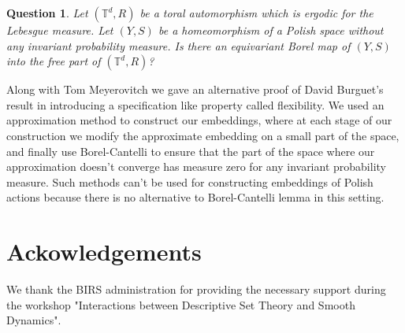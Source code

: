 \documentclass{article}
\newtheorem{question}[theorem]{Question}
\theoremstyle{definition}
\begin{document}
 \begin{question}\label{question: Not_Main}\cite{chandgotia2022borel}
 	Let $(\mathbb T^d, R)$ be a toral automorphism which is ergodic for the Lebesgue measure. Let $(Y, S)$ be a homeomorphism of a Polish space without any invariant probability measure. Is there an equivariant Borel map of $(Y, S)$ into the free part of $(\mathbb T^d, R)$?
 \end{question}
 
Along with Tom Meyerovitch we gave an alternative proof of David Burguet's result in \cite{https://doi.org/10.1112/plms.12398} introducing a specification like property called flexibility. We used an approximation method to construct our embeddings, where at each stage of our construction we modify the approximate embedding on a small part of the space, and finally use Borel-Cantelli to ensure that the part of the space where our approximation doesn't converge has measure zero for any invariant probability measure. Such methods can't be used for constructing embeddings of Polish actions because there is no alternative to Borel-Cantelli lemma in this setting. 

\section{Ackowledgements}

We thank the BIRS administration for providing the necessary support during the workshop "Interactions between Descriptive Set Theory and Smooth Dynamics". 
\end{document}
